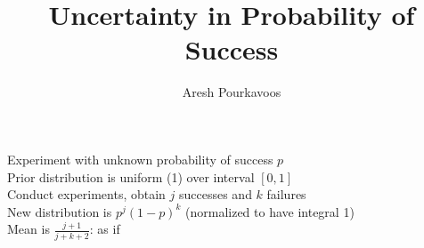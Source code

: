 \documentclass{article}
\begin{document}
\title{Uncertainty in Probability of Success}
\author{Aresh Pourkavoos}
\maketitle

Experiment with unknown probability of success $p$ \\
Prior distribution is uniform (1) over interval $[0, 1]$ \\
Conduct experiments, obtain $j$ successes and $k$ failures \\
New distribution is $p^j(1-p)^k$ (normalized to have integral 1) \\
Mean is $\frac{j+1}{j+k+2}$:
as if 
\end{document}
